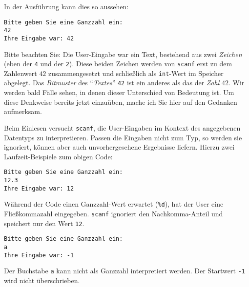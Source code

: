 In der Ausführung kann dies so aussehen:
\begin{cmdbox}
\begin{verbatim}
Bitte geben Sie eine Ganzzahl ein:
42
Ihre Eingabe war: 42
\end{verbatim}
\end{cmdbox}

\begin{hintbox}
Bitte beachten Sie: Die User-Eingabe war ein Text, bestehend aus zwei \emph{Zeichen} (eben der \texttt{4} und der \texttt{2}). Diese beiden Zeichen werden von \texttt{scanf} erst zu dem Zahlenwert $42$ zusammengesetzt und schließlich als \texttt{int}-Wert im Speicher abgelegt. Das \emph{Bitmuster} des \enquote{\emph{Textes}} \texttt{42} ist ein anderes als das der \emph{Zahl} $42$. Wir werden bald Fälle sehen, in denen dieser Unterschied von Bedeutung ist. Um diese Denkweise bereits jetzt einzuüben, mache ich Sie hier auf den Gedanken aufmerksam.
\end{hintbox}

Beim Einlesen versucht \texttt{scanf}, die User-Eingaben im Kontext des angegebenen Datentyps zu interpretieren. Passen die Eingaben nicht zum Typ, so werden sie \idR ignoriert, können aber auch unvorhergesehene Ergebnisse liefern. Hierzu zwei Laufzeit-Beispiele zum obigen Code:

\begin{cmdbox}
\begin{verbatim}
Bitte geben Sie eine Ganzzahl ein:
12.3
Ihre Eingabe war: 12
\end{verbatim}
\end{cmdbox}

Während der Code einen Ganzzahl-Wert erwartet (\texttt{\%d}), hat der User eine Fließkommazahl eingegeben. \texttt{scanf} ignoriert den Nachkomma-Anteil und speichert nur den Wert \texttt{12}.

\begin{cmdbox}
\begin{verbatim}
Bitte geben Sie eine Ganzzahl ein:
a
Ihre Eingabe war: -1
\end{verbatim}
\end{cmdbox}
Der Buchstabe \texttt{a} kann nicht als Ganzzahl interpretiert werden. Der Startwert \texttt{-1} wird nicht überschrieben.

